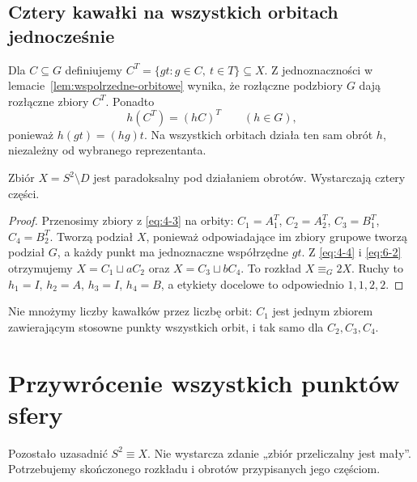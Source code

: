\subsection{Cztery kawałki na wszystkich orbitach jednocześnie}
Dla $C\subseteq G$ definiujemy $C^T=\{gt:g\in C,\ t\in T\}\subseteq X$. Z jednoznaczności w lemacie~\ref{lem:wspolrzedne-orbitowe} wynika, że rozłączne podzbiory $G$ dają rozłączne zbiory $C^T$. Ponadto
\begin{equation}\label{eq:6-2}
 h(C^T)=(hC)^T\qquad(h\in G),
\end{equation}
ponieważ $h(gt)=(hg)t$. Na wszystkich orbitach działa ten sam obrót $h$, niezależny od wybranego reprezentanta.
\begin{twierdzenie}[Paradoksalność $X$]\label{tw:paradoksalnosc-x}
Zbiór $X=S^2\setminus D$ jest paradoksalny pod działaniem obrotów. Wystarczają cztery części.
\end{twierdzenie}
\begin{proof}
Przenosimy zbiory z \eqref{eq:4-3} na orbity: $C_1=A_1^T$, $C_2=A_2^T$, $C_3=B_1^T$, $C_4=B_2^T$. Tworzą podział $X$, ponieważ odpowiadające im zbiory grupowe tworzą podział $G$, a każdy punkt ma jednoznaczne współrzędne $gt$. Z \eqref{eq:4-4} i \eqref{eq:6-2} otrzymujemy $X=C_1\sqcup aC_2$ oraz $X=C_3\sqcup bC_4$. To rozkład $X\mathrel{\equiv_G}2X$. Ruchy to $h_1=I$, $h_2=A$, $h_3=I$, $h_4=B$, a etykiety docelowe to odpowiednio $1,1,2,2$.
\end{proof}
Nie mnożymy liczby kawałków przez liczbę orbit: $C_1$ jest jednym zbiorem zawierającym stosowne punkty wszystkich orbit, i tak samo dla $C_2,C_3,C_4$.

\section{Przywrócenie wszystkich punktów sfery}
Pozostało uzasadnić $S^2\equiv X$. Nie wystarcza zdanie „zbiór przeliczalny jest mały”. Potrzebujemy skończonego rozkładu i obrotów przypisanych jego częściom.

